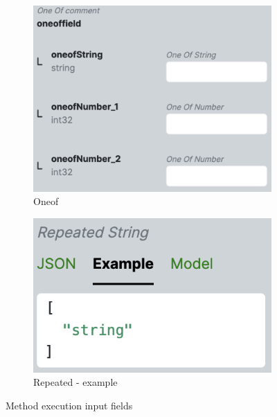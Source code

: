 \begin{figure}[!htb]
    \begin{subfigure}{.33\textwidth}
        \centering
        \includegraphics[width=.95\linewidth]{images/implementation/screenshots/input-oneof}
        \caption{Oneof}
    \end{subfigure}%
    \begin{subfigure}{.33\textwidth}
        \centering
        \includegraphics[width=.95\linewidth]{images/implementation/screenshots/input-repeated}
        \caption{Repeated - example}
    \end{subfigure}

    \caption{Method execution input fields}
    \label{fig:implementation-screenshots-inputs}
\end{figure}

